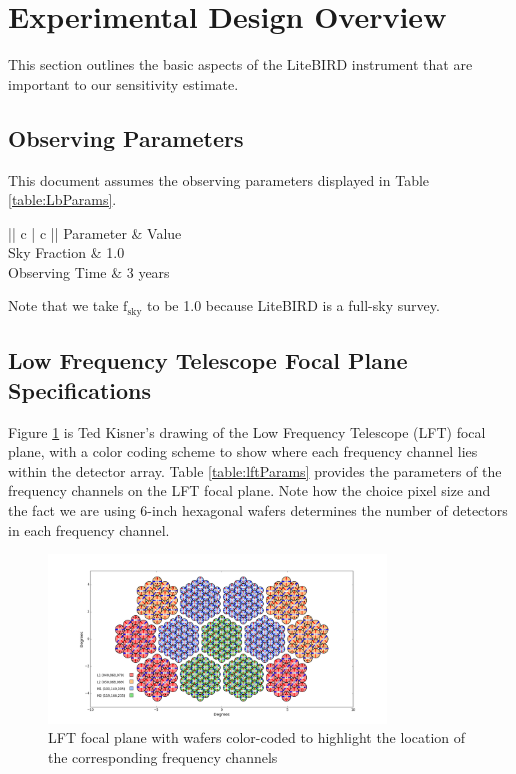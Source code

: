 \documentclass[12pt, titlepage]{article} %
\begin{document}
\section{Experimental Design Overview}

This section outlines the basic aspects of the LiteBIRD instrument that are important to our sensitivity estimate.

\subsection{Observing Parameters}

This document assumes the observing parameters displayed in Table \ref{table:LbParams}.

\begin{table}[H]
\centering
	\begin{tabu}{|| c | c ||}
	\hline
	Parameter & Value \\
	\hline
	\hline
	Sky Fraction & 1.0 \\ 
	\hline
	Observing Time & 3 years \\
	\hline
	\end{tabu}
\caption{Observing parameters \label{table:LbParams}}
\end{table}

Note that we take $\mathrm{f_{sky}}$ to be 1.0 because LiteBIRD is a full-sky survey. 


\subsection{Low Frequency Telescope Focal Plane Specifications}

Figure \ref{fig:lftFP} is Ted Kisner's drawing of the Low Frequency Telescope (LFT) focal plane, with a color coding scheme to show where each frequency channel lies within the detector array. Table \ref{table:lftParams} provides the parameters of the frequency channels on the LFT focal plane. Note how the choice pixel size and the fact we are using 6-inch hexagonal wafers determines the number of detectors in each frequency channel.

\begin{figure}[h!]
	\centering
	\includegraphics[trim={10.0cm, 0.0cm, 10.0cm, 0.0cm}, width=0.8\textwidth]{PNG/LFT_Ted.png}
	\caption{LFT focal plane with wafers color-coded to highlight the location of the corresponding frequency channels \label{fig:lftFP}}
\end{figure}
\end{document}

